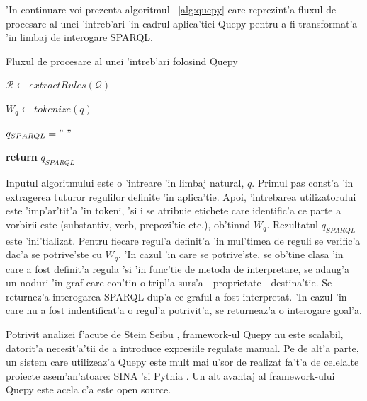 \documentclass[12pt,a4paper,twoside]{report}
\begin{document}
'In continuare voi prezenta algoritmul ~\ref{alg:quepy} care reprezint'a fluxul de procesare al unei 'intreb'ari 'in cadrul aplica'tiei Quepy pentru a fi transformat'a 'in limbaj de interogare SPARQL.

  
\begin{algorithm}
\caption{Fluxul de procesare al unei 'intreb'ari folosind Quepy}
\label{alg:quepy}
 
 
 $\mathcal{R} \leftarrow extractRules(\mathcal{Q})$\;
 
 $W_q \leftarrow tokenize(q)$\;
 
 $q_{SPARQL} = "\ "$\;

{        
\textbf{return} $q_{SPARQL}$
}
\end{algorithm}


Inputul algoritmului este o 'intreare 'in limbaj natural, $q$. Primul pas const'a 'in extragerea tuturor regulilor definite 'in aplica'tie. Apoi, 'intrebarea utilizatorului este 'imp'ar'tit'a 'in tokeni, 'si i se atribuie etichete care identific'a ce parte a vorbirii este (substantiv, verb, prepozi'tie etc.), ob'tin\ia nd $W_q$. Rezultatul $q_{SPARQL}$ este 'ini'tializat. Pentru fiecare regul'a definit'a 'in mul'timea de reguli se verific'a dac'a se potrive'ste cu $W_q$. 'In cazul 'in care se potrive'ste, se ob'tine clasa 'in care a fost definit'a regula 'si 'in func'tie de metoda de interpretare, se adaug'a un noduri 'in graf care con'tin o tripl'a surs'a - proprietate - destina'tie. Se returnez'a interogarea SPARQL dup'a ce graful a fost interpretat. 'In cazul 'in care nu a fost indentificat'a o regul'a potrivit'a, se returneaz'a o interogare goal'a.

Potrivit analizei f'acute de Stein Seibu \cite{SteinSaebuOptiqueNLQF:Technologies}, framework-ul Quepy nu este scalabil, datorit'a necesit'a'tii de a introduce expresiile regulate manual. Pe de alt'a parte, un sistem care utilizeaz'a Quepy este mult mai u'sor de realizat fa't'a de celelalte proiecte asem'an'atoare: SINA \cite{Shekarpour2015SINA:Data} 'si Pythia \cite{Unger2011Pythia:Web}. Un alt avantaj al framework-ului Quepy este acela c'a este open source.


\end{document}
